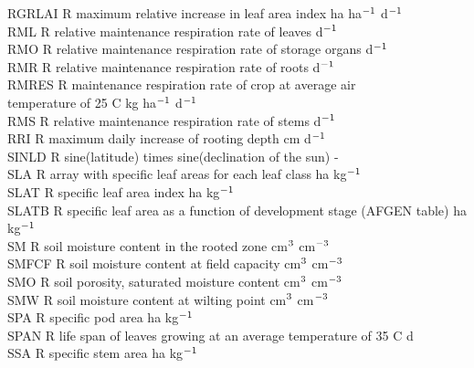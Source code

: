 \begin{tabbing}
RGRLAI\> \> R\> maximum relative increase in leaf area index\> \> \> \> \> \> \> ha ha$^{{\rm -1}}$ d$^{{\rm -1}}$\\
RML\> \> R\> relative maintenance respiration rate of leaves\> \> \> \> \> \> \> d$^{{\rm -1}}$\\
RMO\> \> R\> relative maintenance respiration rate of storage organs\> \> \> \> \> \> \> d$^{{\rm -1}}$\\
RMR\> \> R\> relative maintenance respiration rate of roots\> \> \> \> \> \> \> d$^{{\rm -1}}$ \\
 RMRES   \> \> R   \> maintenance respiration rate of crop at average air \\
\>\> \> temperature of 25 \degrees C \> \> \> \> \> \> \> kg ha$^{{\rm -1}}$ d$^{{\rm -1}}$\\
RMS\> \> R\> relative maintenance respiration rate of stems\> \> \> \> \> \> \> d$^{{\rm -1}}$\\
RRI\> \> R\> maximum daily increase of rooting depth\> \> \> \> \> \> \> cm d$^{{\rm -1}}$\\
SINLD   \> \> R   \> sine(latitude) times sine(declination of the sun)                  \> \> \> \> \> \> \> -\\
SLA     \> \> R   \> array with specific leaf areas for each leaf class       \> \> \> \> \> \> \> ha kg$^{{\rm -1}}$\\
SLAT\> \> R\> specific leaf area index\> \> \> \> \> \> \> ha kg$^{{\rm -1}}$\\
SLATB\> \> R\> specific leaf area as a function of development stage (AFGEN table)\> \> \> \> \> \> \> ha kg$^{{\rm -1}}$\\
SM\> \> R\> soil moisture content in the rooted zone\> \> \> \> \> \> \> cm$^{{\rm 3}}$ cm$^{{\rm -3}}$\\
SMFCF\> \> R\> soil moisture content at field capacity\> \> \> \> \> \> \> cm$^{{\rm 3}}$ cm$^{{\rm -3}}$\\
SMO\> \> R\> soil porosity, saturated moisture content\> \> \> \> \> \> \> cm$^{{\rm 3}}$ cm$^{{\rm -3}}$\\
SMW\> \> R\> soil moisture content at wilting point\> \> \> \> \> \> \> cm$^{{\rm 3}}$ cm$^{{\rm -3}}$\\
SPA\> \> R\> specific pod area\> \> \> \> \> \> \> ha kg$^{{\rm -1}}$\\
SPAN\> \> R\> life span of leaves growing at an average temperature of 35 \degrees C\> \> \> \> \> \> \> d\\
SSA\> \> R\> specific stem area\> \> \> \> \> \> \> ha kg$^{{\rm -1}}$\\

\end{tabbing}
